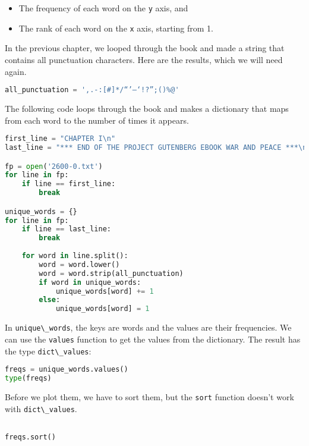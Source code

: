 \begin{itemize}
\item
  The frequency of each word on the \passthrough{\lstinline!y!} axis,
  and
\item
  The rank of each word on the \passthrough{\lstinline!x!} axis,
  starting from 1.
\end{itemize}

In the previous chapter, we looped through the book and made a string
that contains all punctuation characters. Here are the results, which we
will need again.

\begin{lstlisting}[language=Python,style=source]
all_punctuation = ',.-:[#]*/“’—‘!?”;()%@'
\end{lstlisting}

The following code loops through the book and makes a dictionary that
maps from each word to the number of times it appears.

\begin{lstlisting}[language=Python,style=source]
first_line = "CHAPTER I\n"
last_line = "*** END OF THE PROJECT GUTENBERG EBOOK WAR AND PEACE ***\n"

fp = open('2600-0.txt')
for line in fp:
    if line == first_line:
        break

unique_words = {}
for line in fp:
    if line == last_line:
        break
        
    for word in line.split():
        word = word.lower()
        word = word.strip(all_punctuation)
        if word in unique_words:
            unique_words[word] += 1
        else:
            unique_words[word] = 1
\end{lstlisting}

In \passthrough{\lstinline!unique\_words!}, the keys are words and the
values are their frequencies. We can use the
\passthrough{\lstinline!values!} function to get the values from the
dictionary. The result has the type
\passthrough{\lstinline!dict\_values!}:

\begin{lstlisting}[language=Python,style=source]
freqs = unique_words.values()
type(freqs)
\end{lstlisting}

Before we plot them, we have to sort them, but the
\passthrough{\lstinline!sort!} function doesn't work with
\passthrough{\lstinline!dict\_values!}.

\begin{lstlisting}[language=Python,style=source]
%%expect AttributeError

freqs.sort()
\end{lstlisting}

